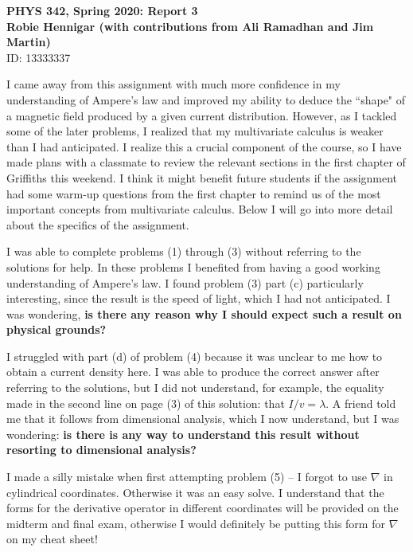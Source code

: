 \documentclass[11pt,usenames,dvipsnames]{article}
\begin{document}
\begin{center}
  \large\textbf{PHYS 342, Spring 2020: Report 3} \\ \vspace{10 pt}
  \textbf{Robie Hennigar (with contributions from Ali Ramadhan and Jim Martin)} \\
  \normalsize ID: 13333337 \\
\end{center}

I came away from this assignment with much more confidence in my understanding of Ampere's law and improved my ability to deduce the ``shape" of a magnetic field produced by a given current distribution.  However, as I tackled some of the later problems, I realized that my multivariate calculus is weaker than I had anticipated.  I realize this a crucial component of the course, so I have made plans with a classmate to review the relevant sections in the first chapter of Griffiths this weekend. I think it might benefit future students if the assignment had some warm-up questions from the first chapter to remind us of the most important concepts from multivariate calculus. Below I will go into more detail about the specifics of the assignment.

I was able to complete problems (1) through (3) without referring to the solutions for help. In these problems I benefited from having a good working understanding of Ampere's law. I found problem (3) part (c) particularly interesting, since the result is the speed of light, which I had not anticipated.  I was wondering, \textbf{ is there any reason why I should expect such a result on physical grounds?}

I struggled with part (d) of problem (4) because it was unclear to me how to obtain a current density here.  I was able to produce the correct answer after referring to the solutions, but I did not understand, for example, the equality made in the second line on page (3) of this solution: that $I/v = \lambda$.  A friend told me that it follows from dimensional analysis, which I now understand, but I was wondering: \textbf{ is there is any way to understand this result without resorting to dimensional analysis?}

I made a silly mistake when first attempting problem (5) -- I forgot to use $\nabla$ in cylindrical coordinates. Otherwise it was an easy solve. I understand that the forms for the derivative operator in different coordinates will be provided on the midterm and final exam, otherwise I would definitely be putting this form for $\nabla$ on my cheat sheet!
\end{document}
